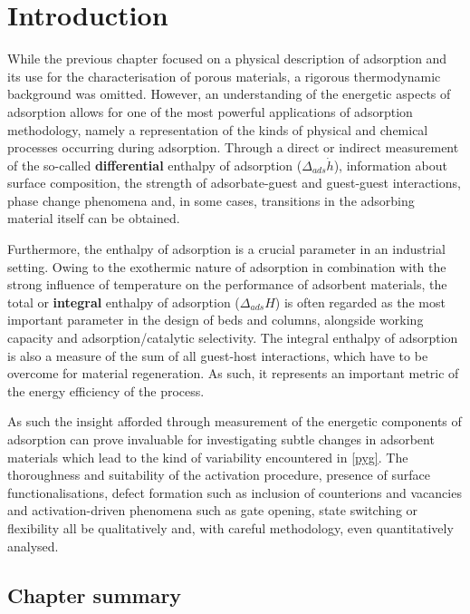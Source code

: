 
\section{Introduction}

While the previous chapter focused on a physical description
of adsorption and its use for the characterisation of
porous materials, a rigorous thermodynamic background
was omitted. However, an understanding of the energetic
aspects of adsorption allows for one of the most powerful
applications of adsorption methodology, namely a representation
of the kinds of physical and chemical processes occurring
during adsorption. Through a direct or indirect measurement
of the so-called \textbf{differential} enthalpy of adsorption (\(\Delta_{ads} \dot{h}\)),
information about surface composition, the strength of
adsorbate-guest and guest-guest interactions, phase change
phenomena and, in some cases, transitions in the
adsorbing material itself can be obtained.

Furthermore, the enthalpy of adsorption is a crucial parameter
in an industrial setting. Owing to the exothermic nature of
adsorption in combination with the strong influence of temperature
on the performance of adsorbent materials, the total or 
\textbf{integral} enthalpy of adsorption (\(\Delta_{ads} H\)) is
often regarded as the most important parameter in the
design of beds and columns, alongside working capacity and
adsorption/catalytic selectivity. The integral enthalpy of adsorption
is also a measure of the sum of all guest-host interactions, which
have to be overcome for material regeneration. As such, it
represents an important metric of the energy efficiency
of the process.

As such the insight afforded through measurement of
the energetic components of adsorption can prove invaluable
for investigating subtle changes in adsorbent materials
which lead to the kind of variability encountered in
\autoref{pyg}. The thoroughness and suitability of the activation
procedure, presence of surface functionalisations, defect
formation such as inclusion of counterions and vacancies
and activation-driven phenomena such as gate opening,
state switching or flexibility all be qualitatively and,
with careful methodology, even quantitatively analysed.

\subsection*{Chapter summary}

